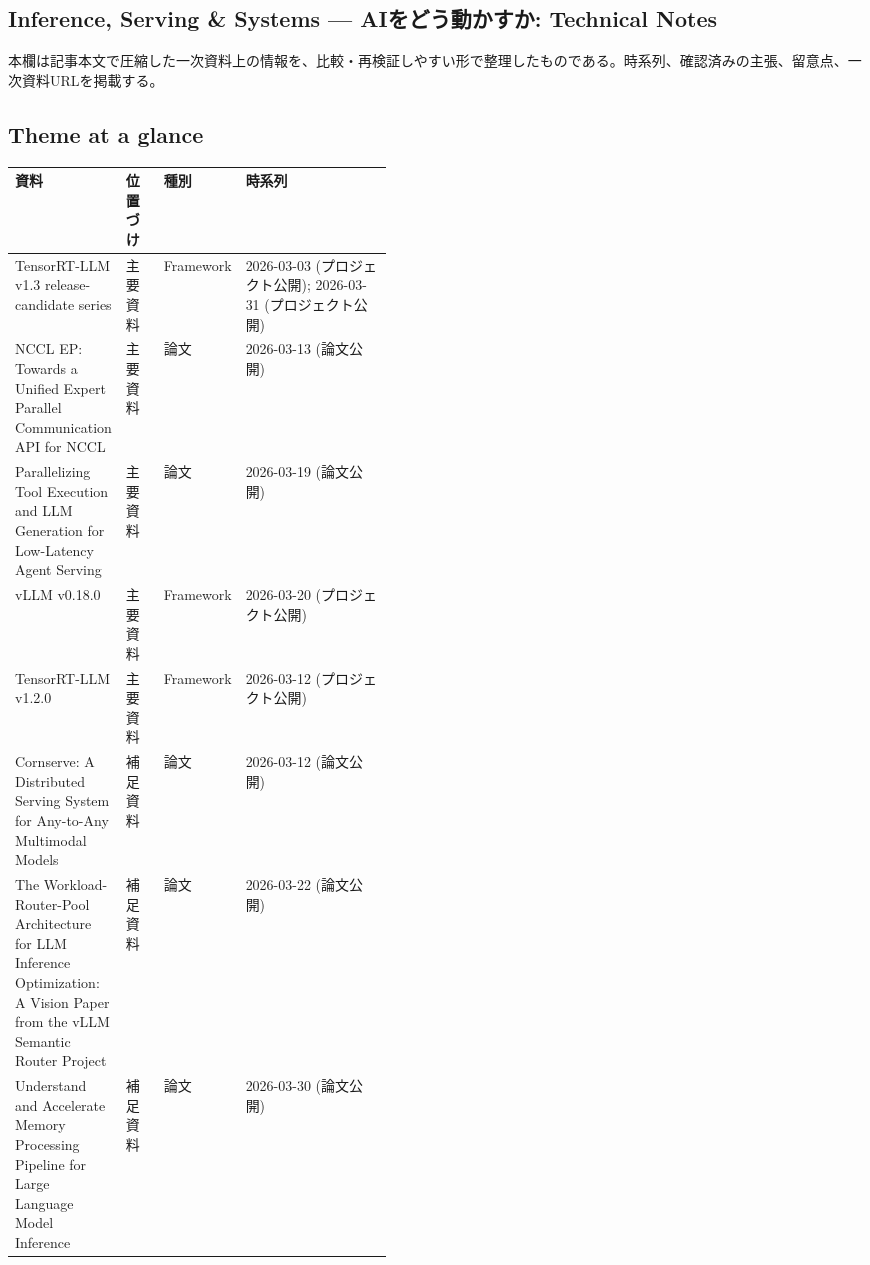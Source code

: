 \subsection*{Inference, Serving \& Systems — AIをどう動かすか: Technical Notes}
本欄は記事本文で圧縮した一次資料上の情報を、比較・再検証しやすい形で整理したものである。時系列、確認済みの主張、留意点、一次資料URLを掲載する。
\medskip
\subsection*{Theme at a glance}
\begin{center}
\footnotesize
\begin{tabularx}{\linewidth}{@{}p{0.20\linewidth}p{0.10\linewidth}p{0.14\linewidth}X@{}}
\toprule
資料 & 位置づけ & 種別 & 時系列 \\
\midrule
TensorRT-LLM v1.3 release-candidate series & 主要資料 & Framework & 2026-03-03 (プロジェクト公開); 2026-03-31 (プロジェクト公開) \\
NCCL EP: Towards a Unified Expert Parallel Communication API for NCCL & 主要資料 & 論文 & 2026-03-13 (論文公開) \\
Parallelizing Tool Execution and LLM Generation for Low-Latency Agent Serving & 主要資料 & 論文 & 2026-03-19 (論文公開) \\
vLLM v0.18.0 & 主要資料 & Framework & 2026-03-20 (プロジェクト公開) \\
TensorRT-LLM v1.2.0 & 主要資料 & Framework & 2026-03-12 (プロジェクト公開) \\
Cornserve: A Distributed Serving System for Any-to-Any Multimodal Models & 補足資料 & 論文 & 2026-03-12 (論文公開) \\
The Workload-Router-Pool Architecture for LLM Inference Optimization: A Vision Paper from the vLLM Semantic Router Project & 補足資料 & 論文 & 2026-03-22 (論文公開) \\
Understand and Accelerate Memory Processing Pipeline for Large Language Model Inference & 補足資料 & 論文 & 2026-03-30 (論文公開) \\
\bottomrule
\end{tabularx}
\end{center}
\normalsize

